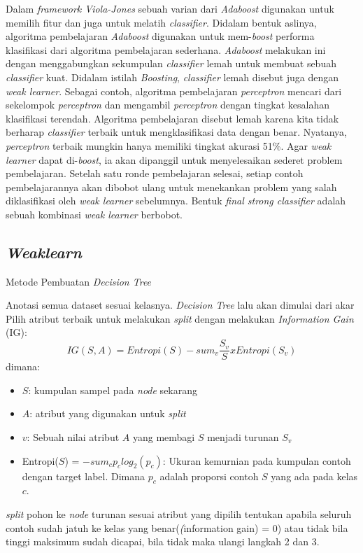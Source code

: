 Dalam \emph{framework Viola-Jones} sebuah varian dari \emph{Adaboost} 
digunakan untuk memilih fitur dan juga untuk melatih \textit{classifier}. 
Didalam bentuk aslinya, algoritma pembelajaran \emph{Adaboost} digunakan 
untuk mem-\textit{boost} performa klasifikasi dari algoritma pembelajaran 
sederhana. \emph{Adaboost} melakukan ini dengan menggabungkan sekumpulan 
\emph{classifier} lemah untuk membuat sebuah \emph{classifier} kuat. 
Didalam istilah \emph{Boosting}, \emph{classifier} lemah disebut juga 
dengan \emph{weak learner}. Sebagai contoh, algoritma pembelajaran \emph{perceptron} 
mencari dari sekelompok \emph{perceptron} dan mengambil \emph{perceptron} 
dengan tingkat kesalahan klasifikasi terendah. Algoritma pembelajaran disebut 
lemah karena kita tidak berharap \emph{classifier} terbaik untuk mengklasifikasi 
data dengan benar. Nyatanya, \emph{perceptron} terbaik mungkin 
hanya memiliki tingkat akurasi 51\%. Agar \emph{weak learner} dapat di-\textit{boost}, 
ia akan dipanggil untuk menyelesaikan sederet problem pembelajaran. Setelah 
satu ronde pembelajaran selesai, setiap contoh pembelajarannya akan dibobot ulang 
untuk menekankan problem yang salah diklasifikasi oleh \emph{weak learner} 
sebelumnya. Bentuk \emph{final strong classifier} adalah 
sebuah kombinasi \emph{weak learner} berbobot. 

\subsection{\emph{Weaklearn}}

\begin{algorithm}
  \caption{Metode Pembuatan \textit{Decision Tree}}
  \begin{algorithmic} [1]
    \State Anotasi semua dataset sesuai kelasnya. \textit{Decision Tree} lalu 
    akan dimulai dari akar
    \State Pilih atribut terbaik untuk melakukan \textit{split} dengan melakukan 
    \emph{Information Gain} (IG):
    \begin{equation}
      IG(S, A) = Entropi(S) - sum_v \frac{S_v}{S} x Entropi(S_v)
    \end{equation} 
    dimana:
    \begin{itemize}
      \item $S$: kumpulan sampel pada \emph{node} sekarang
      \item $A$: atribut yang digunakan untuk \textit{split}
      \item $v$: Sebuah nilai atribut $A$ yang membagi $S$ menjadi turunan $S_v$
      \item Entropi($S$) = $-sum_c p_c log_2(p_c)$: Ukuran kemurnian pada kumpulan 
      contoh dengan target label. Dimana $p_c$ adalah proporsi contoh $S$ yang ada 
      pada kelas $c$. 
    \end{itemize}
    \State \textit{split} pohon ke \textit{node} turunan sesuai atribut yang dipilih 
    \State tentukan apabila seluruh contoh sudah jatuh ke kelas yang benar(\textit(information gain) = 0) 
    atau tidak bila tinggi maksimum sudah dicapai, bila tidak 
    maka ulangi langkah 2 dan 3.
  \end{algorithmic}
\end{algorithm}

